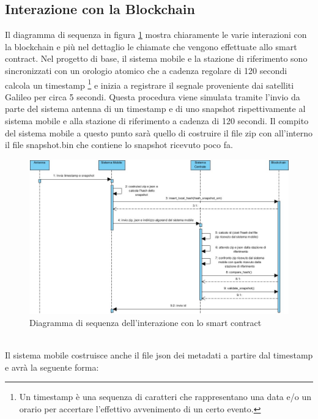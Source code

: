 \subsection{Interazione con la Blockchain}
Il diagramma di sequenza in figura \ref{fig: diagramactivity1} mostra chiaramente le varie interazioni con la blockchain e più nel dettaglio le chiamate che vengono effettuate allo smart contract. Nel progetto di base, il sistema mobile e la stazione di riferimento sono sincronizzati con un orologio atomico che a cadenza regolare di 120 secondi calcola un timestamp \footnote{Un timestamp è una sequenza di caratteri che rappresentano una data e/o un orario per accertare l'effettivo avvenimento di un certo evento.} e inizia a registrare il segnale proveniente dai satelliti Galileo per circa 5 secondi. Questa procedura viene simulata tramite l'invio da parte del sistema antenna di un timestamp e di uno snapshot rispettivamente al sistema mobile e alla stazione di riferimento a cadenza di 120 secondi. Il compito del sistema mobile a questo punto sarà quello di costruire il file zip con all'interno il file snapshot.bin che contiene lo snapshot ricevuto poco fa. 
\begin{figure}[!h]
\centering
\includegraphics[scale=0.6]{images/Sequence Diagram - scambio msg con blockchain.jpg}
\caption{Diagramma di sequenza dell'interazione con lo smart contract}
\label{fig: diagramactivity1}
\end{figure}\\
Il sistema mobile costruisce anche il file json dei metadati a partire dal timestamp e avrà la seguente forma:\\

